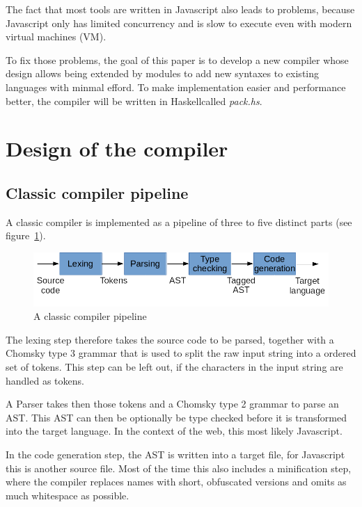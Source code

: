 The fact that most tools are written in Javascript also leads to problems, because Javascript only has limited concurrency and is slow to execute even with modern virtual machines (VM).

To fix those problems, the goal of this paper is to develop a new compiler whose design allows being extended by modules to add new syntaxes to existing languages with minmal efford. To make implementation easier and performance better, the compiler will be written in Haskellcalled \textit{pack.hs}.

\section{Design of the compiler}

\subsection{Classic compiler pipeline}

A classic compiler is implemented as a pipeline of three to five distinct parts (see figure~\ref{fig:compiler_pipeline}).

\begin{figure}[H]
\includegraphics[width=\columnwidth]{./compiler_pipeline.png}
\caption{A classic compiler pipeline}%
\label{fig:compiler_pipeline}
\end{figure}

The lexing step therefore takes the source code to be parsed, together with a Chomsky type 3 grammar that is used to split the raw input string into a ordered set of tokens. This step can be left out, if the characters in the input string are handled as tokens.

A Parser takes then those tokens and a Chomsky type 2 grammar to parse an AST\@. This AST can then be optionally be type checked before it is transformed into the target language. In the context of the web, this most likely Javascript.

In the code generation step, the AST is written into a target file, for Javascript this is another source file. Most of the time this also includes a minification step, where the compiler replaces names with short, obfuscated versions and omits as much whitespace as possible.

